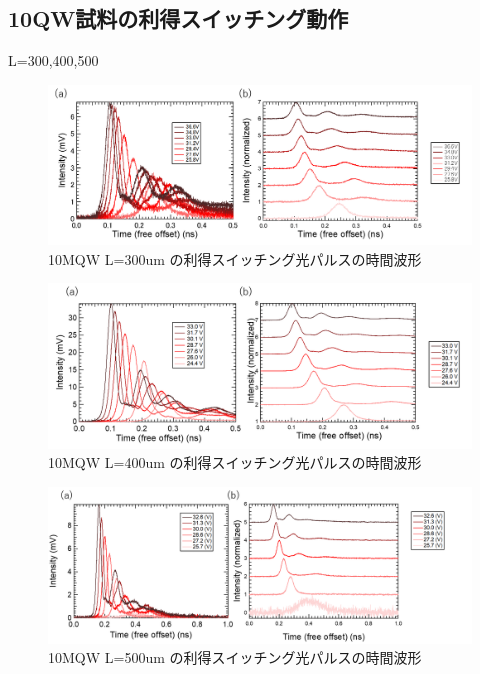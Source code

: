 \subsection{10QW試料の利得スイッチング動作}%
L=300,400,500
\begin{figure}[h]
	\centering
	\includegraphics[width=15cm]{figure/fig_3_2_10QW_ridge_L300_GS.png}
		\caption{10MQW L=300um の利得スイッチング光パルスの時間波形}
		\label{fig:fig_3_2_10QW_ridge_L300_GS}
\end{figure}

\begin{figure}[h]
	\centering
	\includegraphics[width=15cm]{figure/fig_3_2_10QW_ridge_L400_GS.png}
		\caption{10MQW L=400um の利得スイッチング光パルスの時間波形}
		\label{fig:fig_3_2_10QW_ridge_L400_GS}
\end{figure}
\begin{figure}[h]
	\centering
	\includegraphics[width=15cm]{figure/fig_3_2_10QW_ridge_L500_GS.png}
		\caption{10MQW L=500um の利得スイッチング光パルスの時間波形}
		\label{fig:fig_3_2_10QW_ridge_L500_GS}
\end{figure}
\clearpage
